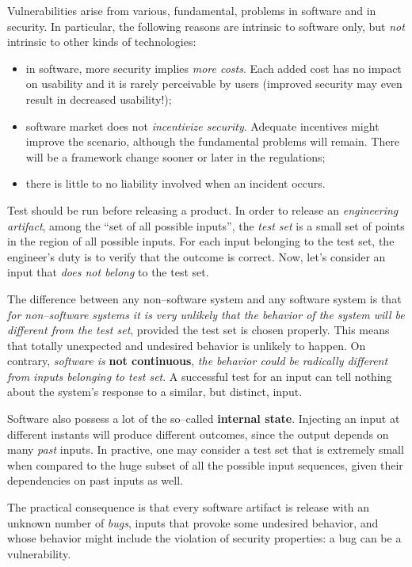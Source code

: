 \documentclass[10pt]{extbook}
\begin{document}
Vulnerabilities arise from various, fundamental, problems in software and in
security. In particular, the following reasons are intrinsic to software only,
but \emph{not} intrinsic to other kinds of technologies:
\begin{itemize}
    \item in software, more security implies \emph{more costs}. Each added cost
        has no impact on usability and it is rarely perceivable by users
        (improved security may even result in decreased usability!);
    \item software market does not \emph{incentivize security}. Adequate
        incentives might improve the scenario, although the fundamental
        problems will remain. There will be a framework change sooner or later
        in the regulations;
    \item there is little to no liability involved when an incident occurs.
\end{itemize}

Test should be run before releasing a product. In order to release an
\emph{engineering artifact}, among the ``set of all possible inputs'', the
\emph{test set} is a small set of points in the region of all possible inputs.
For each input belonging to the test set, the engineer's duty is to verify that
the outcome is correct. Now, let's consider an input that \emph{does not
belong} to the test set.

The difference between any non--software system and any software system is that
\emph{for non--software systems it is very unlikely that the behavior of the
system will be different from the test set}, provided the test set is chosen
properly. This means that totally unexpected and undesired behavior is unlikely
to happen. On contrary, \emph{software is }\textbf{not continuous}, \emph{the behavior
could be radically different from inputs belonging to test set}. A successful
test for an input can tell nothing about the system's response to a similar,
but distinct, input.

Software also possess a lot of the so--called \textbf{internal state}.
Injecting an input at different instants will produce different outcomes, since
the output depends on many \emph{past} inputs. In practive, one may consider a
test set that is extremely small when compared to the huge subset of all the
possible input sequences, given their dependencies on past inputs as well.

The practical consequence is that every software artifact is release with an
unknown number of \emph{bugs}, inputs that provoke some undesired behavior, and
whose behavior might include the violation of security properties: a bug can be
a vulnerability.
\end{document}
